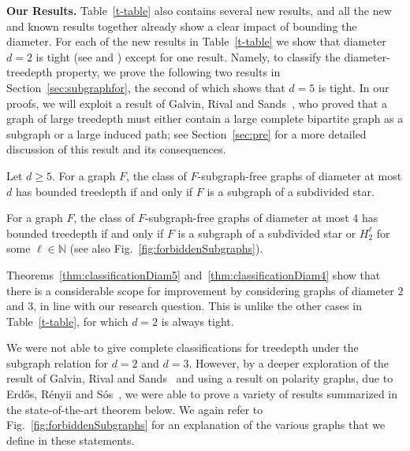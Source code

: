 \documentclass[runningheads,envcountsame]{llncs}
\newcommand{\forbiddenGraph}{F}
\newcommand{\Hgraph}[1]{H_{#1}}
\begin{document}
\medskip
\noindent
{\bf Our Results.}
Table~\ref{t-table} also contains several new results, and all the new and known results together already show a clear impact of bounding the diameter. 
For each of the new results in Table~\ref{t-table} we show that diameter $d=2$ is tight 
(see  and )
except for one result. Namely, to classify the diameter-treedepth property, we prove the following two results in Section~\ref{sec:subgraphfor}, the second of which shows that $d=5$ is tight.  In our proofs, we will exploit a result of Galvin, Rival and Sands~\cite{GALVIN19827},
who proved that a graph of large treedepth must either contain a large complete bipartite graph as a subgraph or a large induced path; see Section~\ref{sec:pre} for a more detailed discussion of this result and its consequences. 

\begin{theorem}\label{thm:classificationDiam5}
Let $d\geq 5$. For a graph $\forbiddenGraph$, the class of $\forbiddenGraph$-subgraph-free graphs of diameter at most $d$ has bounded treedepth if and only if $\forbiddenGraph$ is a subgraph of a subdivided star. 
\end{theorem}

\begin{theorem}\label{thm:classificationDiam4}
For a graph $\forbiddenGraph$, the class of $\forbiddenGraph$-subgraph-free graphs of diameter at most $4$ has bounded treedepth if and only if $\forbiddenGraph$ is a subgraph of a subdivided star or
$\Hgraph{2}^{\ell}$ for some $\ell \in \mathbb{N}$ (see also Fig.~\ref{fig:forbiddenSubgraphs}).
\end{theorem}

\noindent
Theorems~\ref{thm:classificationDiam5} and~\ref{thm:classificationDiam4} show that there is a considerable scope for improvement by considering graphs of diameter $2$ and $3$, in line with our research question. This is unlike the other cases in Table~\ref{t-table}, for which $d=2$ is always tight.

We were not able to give complete classifications for treedepth under the subgraph relation for $d=2$ and $d=3$. However, by a deeper exploration of the result of Galvin, Rival and Sands~\cite{GALVIN19827} and using a result on polarity graphs, due to Erd{\H{o}}s, R{\'e}nyii and S{\'o}s~\cite{ERTS66},
we were able to prove a variety of results summarized in the state-of-the-art theorem below.
We again refer to Fig.~\ref{fig:forbiddenSubgraphs} for an explanation of the various graphs that we define in these statements. 
\end{document}
